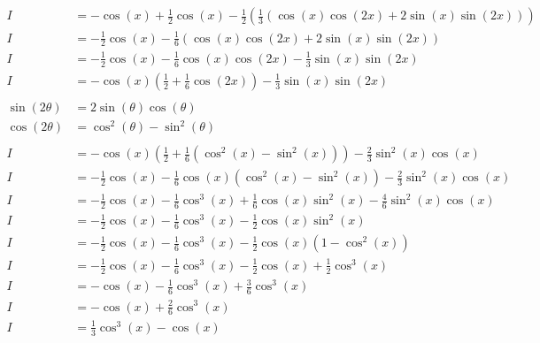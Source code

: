 \documentclass[12pt]{article}
\begin{document}
\begin{align}
    I              & = -\cos(x) + \frac{1}{2} \cos(x) - \frac{1}{2}  \left( \frac{1}{3}\left(\cos(x)\cos(2x) + 2\sin(x)\sin(2x)\right) \right) \\
    I              & = -\frac{1}{2}\cos(x) - \frac{1}{6}\left(\cos(x)\cos(2x) + 2\sin(x)\sin(2x)\right)                                        \\
    I              & = -\frac{1}{2}\cos(x) - \frac{1}{6}\cos(x)\cos(2x) - \frac{1}{3}\sin(x)\sin(2x)                                           \\
    I              & = -\cos(x)(\frac{1}{2} + \frac{1}{6}\cos(2x)) - \frac{1}{3}\sin(x)\sin(2x)                                                \\
    \nonumber                                                                                                                                  \\
    \sin(2\theta)  & = 2\sin(\theta)\cos(\theta)                                                                                               \\
    \cos(2\theta)  & = \cos^2(\theta) - \sin^2(\theta)                                                                                         \\
    \nonumber                                                                                                                                  \\
    I              & = -\cos(x)(\frac{1}{2} + \frac{1}{6}(\cos^2(x) - \sin^2(x))) - \frac{2}{3}\sin^2(x)\cos(x)                                \\
    I              & = -\frac{1}{2}\cos(x) -\frac{1}{6}\cos(x)(\cos^2(x) - \sin^2(x)) - \frac{2}{3}\sin^2(x)\cos(x)                            \\
    I              & = -\frac{1}{2}\cos(x) -\frac{1}{6}\cos^3(x) + \frac{1}{6}\cos(x)\sin^2(x) - \frac{4}{6}\sin^2(x)\cos(x)                   \\
    I              & = -\frac{1}{2}\cos(x) -\frac{1}{6}\cos^3(x) - \frac{1}{2}\cos(x)\sin^2(x)                                                 \\
    I              & = -\frac{1}{2}\cos(x) -\frac{1}{6}\cos^3(x) - \frac{1}{2}\cos(x)(1-\cos^2(x))                                             \\
    I              & = -\frac{1}{2}\cos(x) -\frac{1}{6}\cos^3(x) - \frac{1}{2}\cos(x) + \frac{1}{2} \cos^3(x)                                  \\
    I              & = -\cos(x) - \frac{1}{6}\cos^3(x) + \frac{3}{6} \cos^3(x)                                                                 \\
    I              & = -\cos(x) + \frac{2}{6}\cos^3(x)                                                                                         \\
    I              & = \frac{1}{3}\cos^3(x) - \cos(x)
\end{align}
\end{document}
